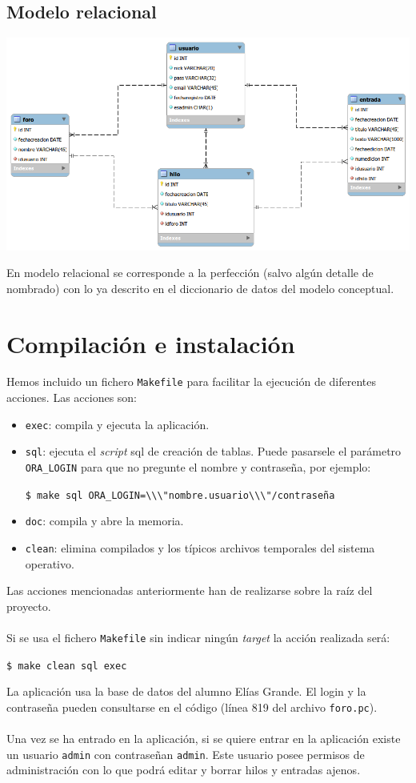 \documentclass[12pt, a4paper, titlepage]{article}
\begin{document}
\subsection{Modelo relacional}

\includegraphics[width=15cm]{./img/relacional.png}

En modelo relacional se corresponde a la perfección (salvo algún detalle de nombrado) con lo ya descrito en el diccionario de datos del modelo conceptual.

\section{Compilación e instalación}
Hemos incluido un fichero \texttt{Makefile} para facilitar la ejecución de diferentes acciones. Las acciones son:
\begin{itemize}
	\item \texttt{exec}: compila y ejecuta la aplicación.
	\item \texttt{sql}: ejecuta el \textit{script} sql de creación de tablas. Puede pasarsele el parámetro \texttt{ORA\_LOGIN} para que no pregunte el nombre y contraseña, por ejemplo:
	\begin{center}
	\lstinline[language={}]{$ make sql ORA_LOGIN=\\\"nombre.usuario\\\"/contraseña}
	\end{center}
	\item \texttt{doc}: compila y abre la memoria.
	\item \texttt{clean}: elimina compilados y los típicos archivos temporales del sistema operativo.
\end{itemize}
Las acciones mencionadas anteriormente han de realizarse sobre la raíz del proyecto.
\paragraph{}
Si se usa el fichero \texttt{Makefile} sin indicar ningún \textit{target} la acción realizada será:
	\begin{center}
	\lstinline[language={}]{$ make clean sql exec}
	\end{center}
La aplicación usa la base de datos del alumno Elías Grande. El login y la contraseña pueden consultarse en el código (línea 819 del archivo \texttt{foro.pc}).
\paragraph{}
Una vez se ha entrado en la aplicación, si se quiere entrar en la aplicación existe un usuario \texttt{admin} con contraseñan \texttt{admin}. Este usuario posee permisos de administración con lo que podrá editar y borrar hilos y entradas ajenos.
\end{document}
